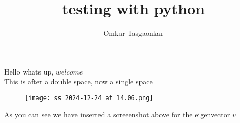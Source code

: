 \documentclass{article}
\title{testing with python}
\author{Omkar Tasgaonkar}
\begin{document}
\maketitle
Hello whats up, $welcome$\\

This is after a double space, now a single space

\begin{figure}[h]
\texttt{[image: ss 2024-12-24 at 14.06.png]}
\end{figure}
As you can see we have inserted a screeenshot above for the eigenvector $v$\\
\end{document}

